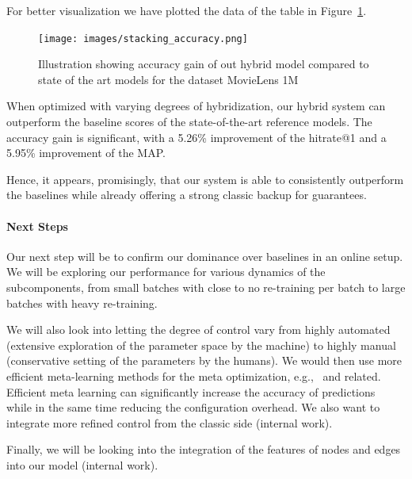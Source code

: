 For better visualization we have plotted the data of the table in Figure~\ref{fig:accuracy_hybrid}.

\begin{figure}[htbp!]
\centering
\texttt{[image: images/stacking\_accuracy.png]}
\caption{Illustration showing accuracy gain of out hybrid model compared to state of the art models for the dataset MovieLens 1M}
\label{fig:accuracy_hybrid}
\end{figure}

When optimized with varying degrees of hybridization, our hybrid system can outperform the baseline scores of the state-of-the-art reference models. The accuracy gain is significant, with a 5.26\% improvement of the hitrate@1 and a 5.95\% improvement of the MAP.

Hence, it appears, promisingly, that our system is able to consistently outperform the baselines while already offering a strong classic backup for guarantees.


\paragraph{Next Steps}
Our next step will be to confirm our dominance over baselines in an online setup. We will be exploring our performance for various dynamics of the subcomponents, from small batches with close to no re-training per batch to large batches with heavy re-training.

We will also look into letting the degree of control vary from highly automated (extensive exploration of the parameter space by the machine) to highly manual (conservative setting of the parameters by the humans). We would then use more efficient meta-learning methods for the meta optimization, e.g.,~\cite{jaderberg2017population} and related. Efficient meta learning can significantly increase the accuracy of predictions~\cite{breimanstacked,geron2019hands,sillfeature} while in the same time reducing the configuration overhead.
We also want to integrate more refined control from the classic side (internal work).

Finally, we will be looking into the integration of the features of nodes and edges into our model (internal work).


% 
%

